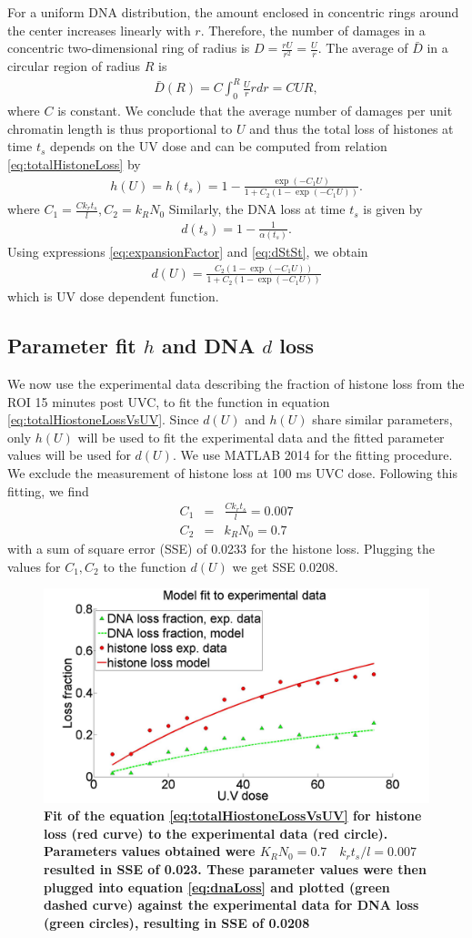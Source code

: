 \documentclass[12pt]{article}
\newcommand{\beq}{\begin{eqnarray}}
\newcommand{\eeq}{\end{eqnarray}}
\begin{document}
For a uniform DNA distribution, the amount enclosed in concentric rings around the center increases linearly with $r$. Therefore, the number of damages in a concentric two-dimensional ring of radius is ${D}= \frac{rU}{r^2}=\frac{U}{r}$. The average of $\bar{D}$ in a circular region of radius $R$ is
\beq
\bar{D}(R) = C\int_0^R \frac{U}{r} rdr = CUR,
\eeq
where $C$ is constant. We conclude that the average number of damages per unit chromatin length is thus proportional to $U$ and thus the total loss of histones at time  $t_{s}$ depends on the UV dose and can be computed from relation \ref{eq:totalHistoneLoss} by
\beq\label{eq:totalHiostoneLossVsUV}
h(U)=h(t_s)=1-\frac{\exp(-C_1 U)}{ 1+C_2(1-\exp(-C_1 U))}.
\eeq
where $C_1=\frac{Ck_rt_s}{l}, C_2=k_RN_0$
Similarly, the DNA loss at time $t_{s}$ is given by 
\beq\label{eq:dStSt}
d(t_s)= 1-\frac1{\alpha(t_s)}. 
\eeq
Using expressions \ref{eq:expansionFactor} and \ref{eq:dStSt}, we obtain
\beq\label{eq:dnaLoss}
d(U)= \frac{C_2(1-\exp(-C_1 U))}{1+C_2(1-\exp(-C_1 U))}
\eeq
which is UV dose dependent function. 


\subsection{Parameter fit $h$ and DNA $d$ loss}\label{subsection:parameterFit}
We now use the experimental data describing the fraction of histone loss from the ROI 15 minutes post UVC, to fit the function in equation \ref{eq:totalHiostoneLossVsUV}. Since $d(U)$ and $h(U)$ share similar parameters, only $h(U)$ will be used to fit the experimental data and the fitted parameter values will be used for $d(U)$. We use MATLAB 2014 for the fitting procedure. We exclude the measurement of histone loss at 100 ms UVC dose. Following this fitting, we find
\beq
C_1 &=& \frac{Ck_rt_s}{l} = 0.007\\
C_2 &=& k_RN_0 = 0.7
\eeq
with a sum of square error (SSE) of 0.0233 for the histone loss. Plugging the values for $C_1,C_2$ to the function $d(U)$ we get SSE 0.0208. 

\begin{figure}[H]
\centering
\includegraphics[width=0.5\linewidth, height=0.3\textheight]{histoneAndDnaVsUvDoseModelFit}
\caption{\textbf{Fit of the equation \ref{eq:totalHiostoneLossVsUV} for histone loss (red curve) to the experimental data (red circle). Parameters values obtained were $K_RN_0 =0.7\quad k_rt_s/l=0.007$ resulted in SSE of 0.023. These parameter values were then plugged into equation \ref{eq:dnaLoss} and plotted (green dashed curve) against the experimental data for DNA loss (green circles), resulting in SSE of 0.0208}}
\label{fig:histoneAndDnaVsUvDoseModelFit}
\end{figure}
\end{document}
